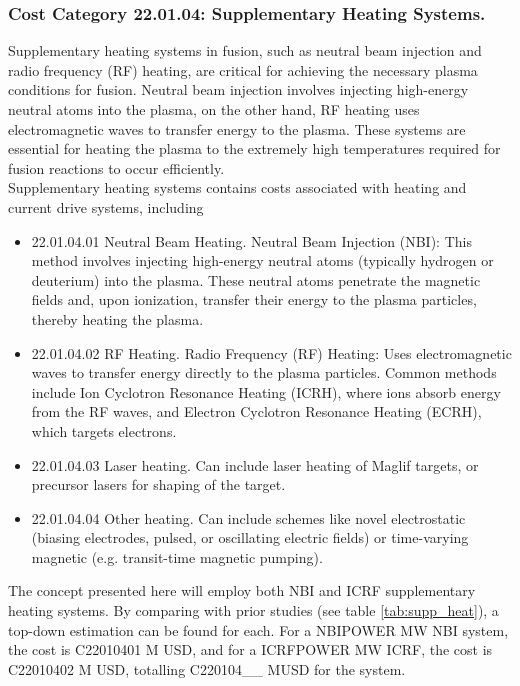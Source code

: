 
\subsubsection*{Cost Category 22.01.04: Supplementary Heating Systems.}

Supplementary heating systems in fusion, such as neutral beam injection and radio frequency (RF) heating, are critical for achieving the necessary plasma conditions for fusion. Neutral beam injection involves injecting high-energy neutral atoms into the plasma, on the other hand, RF heating uses electromagnetic waves to transfer energy to the plasma. These systems are essential for heating the plasma to the extremely high temperatures required for fusion reactions to occur efficiently.\\

Supplementary heating systems contains costs associated with heating and current drive systems, including

\begin{itemize}
    \item 22.01.04.01 Neutral Beam Heating.   Neutral Beam Injection (NBI): This method involves injecting high-energy neutral atoms (typically hydrogen or deuterium) into the plasma. These neutral atoms penetrate the magnetic fields and, upon ionization, transfer their energy to the plasma particles, thereby heating the plasma.
    \item 22.01.04.02 RF Heating.  Radio Frequency (RF) Heating: Uses electromagnetic waves to transfer energy directly to the plasma particles. Common methods include Ion Cyclotron Resonance Heating (ICRH), where ions absorb energy from the RF waves, and Electron Cyclotron Resonance Heating (ECRH), which targets electrons.
    \item 22.01.04.03 Laser heating.  Can include laser heating of Maglif targets, or precursor lasers for shaping of the target.
    \item 22.01.04.04 Other heating.  Can include schemes like novel electrostatic (biasing electrodes, pulsed, or oscillating electric fields) or time-varying magnetic (e.g. transit-time magnetic pumping).
\end{itemize}


The concept presented here will employ both NBI and ICRF supplementary heating systems. By comparing with prior studies (see table \ref{tab:supp_heat}), a top-down estimation can be found for each. For a NBIPOWER MW NBI system, the cost is C22010401 M USD, and for a ICRFPOWER MW ICRF, the cost is C22010402 M USD, totalling C220104__ MUSD for the system.

